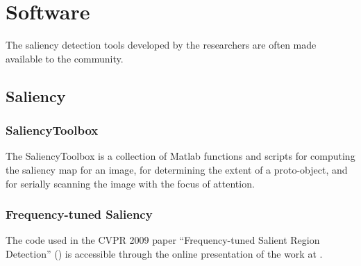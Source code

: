 \section{Software}
\label{sec:soft}

The saliency detection tools developed by the researchers are often made available to the community.

\subsection{Saliency}
\subsubsection{SaliencyToolbox}\label{subsec:saltool}
The SaliencyToolbox is a collection of Matlab functions and scripts for computing the saliency map for an image, for determining the extent of a proto-object, and for serially scanning the image with the focus of attention. 

\subsubsection{Frequency-tuned Saliency}
The code used in the CVPR 2009 paper ``Frequency-tuned Salient Region Detection'' (\cite{LCAV-CONF-2009-012}) is accessible through the online presentation of the work at \cite{achantaCVPR09}.
